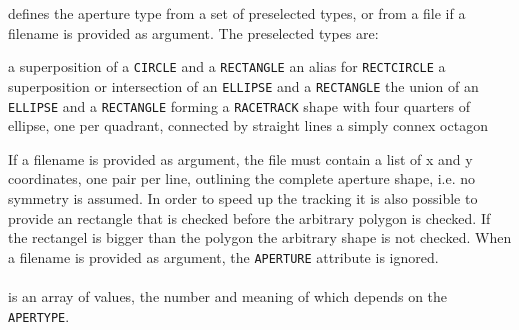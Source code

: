 \begin{madlist}
   defines the aperture type from a set of
  preselected types, or from a file if a filename is provided as argument.
  The preselected types are:
  \begin{madlist}
     a superposition of a \texttt{CIRCLE} and a
    \texttt{RECTANGLE}  
     an alias for \texttt{RECTCIRCLE}
     a superposition or intersection of an
    \texttt{ELLIPSE} and a \texttt{RECTANGLE} 
     the union of an \texttt{ELLIPSE} and a 
    \texttt{RECTANGLE} forming a \texttt{RACETRACK} shape with four
    quarters of ellipse, one per quadrant, connected by straight lines
     a simply connex octagon
  \end{madlist}
  If a filename is provided as argument, the file must contain a 
  list of x and y coordinates, one pair per line, outlining the complete aperture shape, 
  i.e. no symmetry is assumed. In order to speed up the tracking it is also possible to
  provide an rectangle that is checked before the arbitrary polygon is checked. If the 
  rectangel is bigger than the polygon the arbitrary shape is not checked. 
  When a filename is provided as argument, the \texttt{APERTURE} attribute is ignored.\\
  \\
   is an array of values, the number and meaning 
  of which depends on the \texttt{APERTYPE}.  
\end{madlist}

